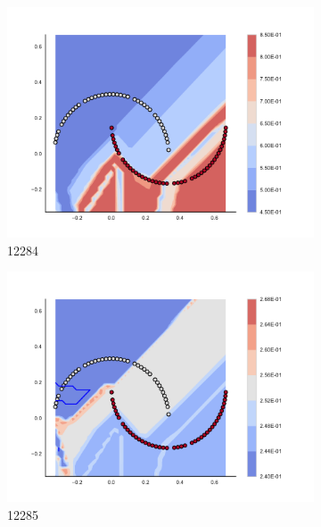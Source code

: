 \begin{figure}[h]
\begin{subfigure}[b]{0.09\textwidth}
    \includegraphics[clip, trim=2.35cm 1.75cm 4.5cm 0cm,width=\textwidth]{img/convergence/12284.pdf}
    \caption{12284}
    \label{fig:convergence_12284}
\end{subfigure}
%
\begin{subfigure}[b]{0.09\textwidth}
    \includegraphics[clip, trim=2.35cm 1.75cm 4.5cm 0cm,width=\textwidth]{img/convergence/12285.pdf}
    \caption{12285}
    \label{fig:convergence_12285}
\end{subfigure}
%
\begin{subfigure}[b]{0.09\textwidth}

\end{subfigure}
\end{figure}
